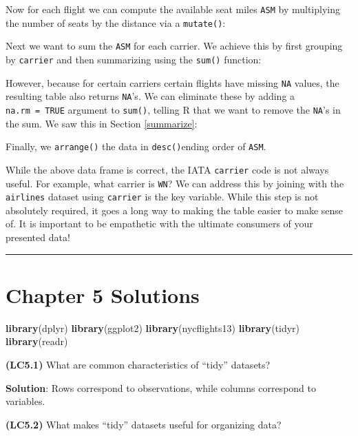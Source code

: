 \documentclass[12pt, krantz2,]{krantz}
\makeatletter
\newenvironment{Shaded}{\begin{snugshade}}{\end{snugshade}}
\newcommand{\KeywordTok}[1]{\textcolor[rgb]{0.27,0.27,0.27}{\textbf{#1}}}
\newcommand{\NormalTok}[1]{#1}
\newenvironment{kframe}{%
\medskip{}
\setlength{\fboxsep}{.8em}
 \def\at@end@of@kframe{}%
 \ifinner\ifhmode%
  \def\at@end@of@kframe{\end{minipage}}%
  \begin{minipage}{\columnwidth}%
 \fi\fi%
 \def\FrameCommand##1{\hskip\@totalleftmargin \hskip-\fboxsep
 \colorbox{shadecolor}{##1}\hskip-\fboxsep
     \hskip-\linewidth \hskip-\@totalleftmargin \hskip\columnwidth}%
 \MakeFramed {\advance\hsize-\width
   \@totalleftmargin\z@ \linewidth\hsize
   \@setminipage}}%
 {\par\unskip\endMakeFramed%
 \at@end@of@kframe}
\renewenvironment{Shaded}{\begin{kframe}}{\end{kframe}}
\makeatother
\begin{document}
Now for each flight we can compute the available seat miles \texttt{ASM} by multiplying the number of seats by the distance via a \texttt{mutate()}:

Next we want to sum the \texttt{ASM} for each carrier. We achieve this by first grouping by \texttt{carrier} and then summarizing using the \texttt{sum()} function:

However, because for certain carriers certain flights have missing \texttt{NA} values, the resulting table also returns \texttt{NA}'s. We can eliminate these by adding a \texttt{na.rm\ =\ TRUE} argument to \texttt{sum()}, telling R that we want to remove the \texttt{NA}'s in the sum. We saw this in Section \ref{summarize}:

Finally, we \texttt{arrange()} the data in \texttt{desc()}ending order of \texttt{ASM}.

While the above data frame is correct, the IATA \texttt{carrier} code is not always useful. For example, what carrier is \texttt{WN}? We can address this by joining with the \texttt{airlines} dataset using \texttt{carrier} is the key variable. While this step is not absolutely required, it goes a long way to making the table easier to make sense of. It is important to be empathetic with the ultimate consumers of your presented data!

\begin{center}\rule{0.5\linewidth}{\linethickness}\end{center}

\hypertarget{chapter-5-solutions}{%
\section{Chapter 5 Solutions}\label{chapter-5-solutions}}

\begin{Shaded}
\begin{Highlighting}[]
\KeywordTok{library}\NormalTok{(dplyr)}
\KeywordTok{library}\NormalTok{(ggplot2)}
\KeywordTok{library}\NormalTok{(nycflights13)}
\KeywordTok{library}\NormalTok{(tidyr)}
\KeywordTok{library}\NormalTok{(readr)}
\end{Highlighting}
\end{Shaded}

\textbf{(LC5.1)} What are common characteristics of ``tidy'' datasets?

\textbf{Solution}: Rows correspond to observations, while columns correspond to variables.

\textbf{(LC5.2)} What makes ``tidy'' datasets useful for organizing data?
\end{document}
